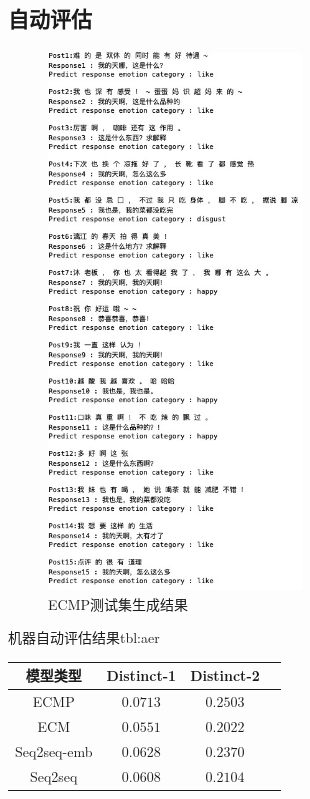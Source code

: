 \documentclass[supercite]{HustGraduPaper}
\theoremstyle{definition}
\begin{document}
\subsection{自动评估}
\begin{figure}[H] %
  \centering %
  \includegraphics[width=0.6\textwidth]{images/result.png} %
  \caption{ECMP测试集生成结果} %
  \label{Fig.result} %
\end{figure}

\begin{generaltab}{机器自动评估结果}{tbl:aer}
  \begin{tabular}{c|ccc}
    \toprule
    模型类型 & Distinct-1 & Distinct-2 \\
    \midrule
    ECMP & $0.0713$ & $0.2503$\\
    ECM & $0.0551$ & $0.2022$\\
    Seq2seq-emb & $0.0628$ & $0.2370$\\
    Seq2seq & $0.0608$ & $0.2104$\\
    \bottomrule
  \end{tabular}
\end{generaltab}
\end{document}
